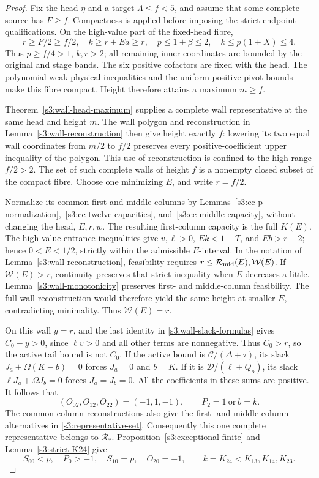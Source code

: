 \documentclass[11pt,reqno]{amsart}
\theoremstyle{definition}
\theoremstyle{remark}
\begin{document}
\begin{proof}
Fix the head \(\eta\) and a target \(\Lambda\le f<5\), and assume
that some complete source has \(F\ge f\). Compactness is applied
before imposing the strict endpoint qualifications. On the high-value
part of the fixed-head fibre,
\[
 r\ge F/2\ge f/2,\quad k\ge r+Ea\ge r,\quad
 p\le1+\beta\le2,\quad k\le p(1+X)\le4.
\]
Thus \(p\ge f/4>1\), \(k,r>2\); all remaining inner coordinates
are bounded by the original and stage bands. The six positive
cofactors are fixed with the head. The polynomial weak physical
inequalities and the uniform positive pivot bounds make this fibre
compact. Height therefore attains a maximum \(m\ge f\).

Theorem~\ref{s3:wall-head-maximum} supplies a complete wall
representative at the same head and height \(m\).
The wall polygon and reconstruction in
Lemma~\ref{s3:wall-reconstruction} then give height exactly \(f\):
lowering its two equal wall coordinates from \(m/2\) to \(f/2\)
preserves every positive-coefficient upper inequality of the polygon.
This use of reconstruction is confined to the high range \(f/2>2\).
The set of such complete walls of height \(f\) is a nonempty closed
subset of the compact fibre. Choose one minimizing \(E\), and
write \(r=f/2\).

Normalize its common first and middle columns by
Lemmas~\ref{s3:cc-p-normalization},~\ref{s3:cc-twelve-capacities},
and~\ref{s3:cc-middle-capacity}, without changing the head, \(E,r,w\).
The resulting first-column capacity is the full \(K(E)\).
The high-value entrance inequalities give
\(v,\ell>0\), \(Ek<1-T\), and \(Eb>r-2\); hence
\(0<E<1/2\), strictly within the admissible \(E\)-interval.
In the notation of Lemma~\ref{s3:wall-reconstruction}, feasibility
requires \(r\le\mathcal R_{\rm mid}(E),\mathcal W(E)\).
If \(\mathcal W(E)>r\), continuity preserves that strict inequality when
\(E\) decreases a little. Lemma~\ref{s3:wall-monotonicity} preserves
first- and middle-column feasibility. The full wall reconstruction
would therefore yield the same height at smaller \(E\), contradicting
minimality. Thus \(\mathcal W(E)=r\).

On this wall \(y=r\), and the last identity in
\eqref{s3:wall-slack-formulas} gives \(C_0-y>0\), since
\(\ell v>0\) and all other terms are nonnegative. Thus
\(C_0>r\), so the active tail bound is not \(C_0\). If the active
bound is \(\mathcal C/(\Delta+\tau)\), its slack
\(J_a+\Omega(K-b)=0\) forces \(J_a=0\) and \(b=K\).
If it is \(\mathcal D/(\ell+Q_o)\), its slack
\(\ell J_a+\Omega J_b=0\) forces \(J_a=J_b=0\).
All the coefficients in these sums are positive. It follows that
\[
 (O_{02},O_{12},O_{22})=(-1,1,-1),
 \qquad P_2=1\ \text{or}\ b=k.
\]
The common column reconstructions also give the first- and
middle-column alternatives in \eqref{s3:representative-set}.
Consequently this one complete representative belongs to
\(\mathcal R_*\). Proposition~\ref{s3:exceptional-finite} and
Lemma~\ref{s3:strict-K24} give
\[
 S_{00}<p,\quad P_0>-1,\quad S_{10}=p,\quad O_{20}=-1,
 \qquad k=K_{24}<K_{13},K_{14},K_{23}.
\]


\end{proof}
\end{document}
